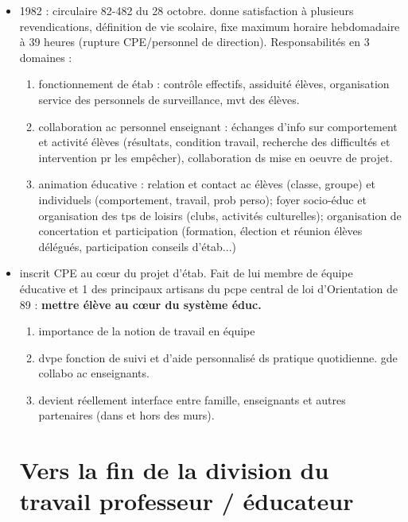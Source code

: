 \documentclass[12pt]{report}
\begin{document}
\begin{itemize}
\item 1982 : circulaire 82-482 du 28 octobre. donne satisfaction à plusieurs revendications, définition de vie scolaire, fixe maximum horaire hebdomadaire à 39 heures (rupture CPE/personnel de direction). Responsabilités en 3 domaines : \\
\begin{enumerate}
\item fonctionnement de étab : contrôle effectifs, assiduité élèves, organisation service des personnels de surveillance, mvt des élèves.\\
\item collaboration ac personnel enseignant : échanges d'info sur comportement et activité élèves (résultats, condition travail, recherche des difficultés et intervention pr les empêcher), collaboration ds mise en oeuvre de projet. \\
\item animation éducative : relation et contact ac élèves (classe, groupe) et individuels (comportement, travail, prob perso); foyer socio-éduc et organisation des tps de loisirs (clubs, activités culturelles); organisation de concertation et participation (formation, élection et réunion élèves délégués, participation conseils d'étab...) \\
\end{enumerate}

\item inscrit CPE au cœur du projet d'étab. Fait de lui membre de équipe éducative et 1 des principaux artisans du pcpe central de loi d'Orientation de 89 : \textbf{mettre élève au cœur du système éduc.} \\
\begin{enumerate}
\item importance de la notion de travail en équipe \\
\item dvpe fonction de suivi et d'aide personnalisé ds pratique quotidienne. gde collabo ac enseignants.
\item devient réellement interface entre famille, enseignants et autres partenaires (dans et hors des murs).\\
\end{enumerate}


\section{Vers la fin de la division du travail professeur / éducateur}


\end{itemize}
\end{document}
